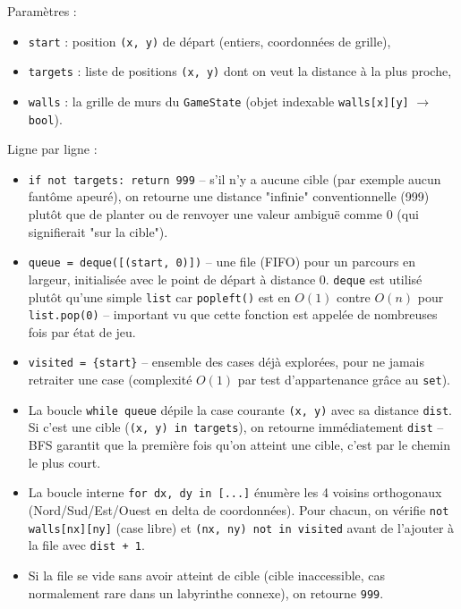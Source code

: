\documentclass[a4paper,12pt]{article}
\begin{document}
Paramètres :
\begin{itemize}
    \item \texttt{start} : position \texttt{(x, y)} de départ (entiers,
    coordonnées de grille),
    \item \texttt{targets} : liste de positions \texttt{(x, y)} dont on
    veut la distance à la plus proche,
    \item \texttt{walls} : la grille de murs du \texttt{GameState}
    (objet indexable \texttt{walls[x][y]} $\to$ \texttt{bool}).
\end{itemize}

Ligne par ligne :
\begin{itemize}
    \item \texttt{if not targets: return 999} -- s'il n'y a aucune cible
    (par exemple aucun fantôme apeuré), on retourne une distance
    "infinie" conventionnelle (999) plutôt que de planter ou de renvoyer
    une valeur ambiguë comme 0 (qui signifierait "sur la cible").
    \item \texttt{queue = deque([(start, 0)])} -- une file (FIFO) pour un
    parcours en largeur, initialisée avec le point de départ à distance 0.
    \texttt{deque} est utilisé plutôt qu'une simple \texttt{list} car
    \texttt{popleft()} est en $O(1)$ contre $O(n)$ pour
    \texttt{list.pop(0)} -- important vu que cette fonction est appelée
    de nombreuses fois par état de jeu.
    \item \texttt{visited = \{start\}} -- ensemble des cases déjà
    explorées, pour ne jamais retraiter une case (complexité $O(1)$ par
    test d'appartenance grâce au \texttt{set}).
    \item La boucle \texttt{while queue} dépile la case courante
    \texttt{(x, y)} avec sa distance \texttt{dist}. Si c'est une cible
    (\texttt{(x, y) in targets}), on retourne immédiatement \texttt{dist}
    -- BFS garantit que la première fois qu'on atteint une cible, c'est
    par le chemin le plus court.
    \item La boucle interne \texttt{for dx, dy in [...]} énumère les 4
    voisins orthogonaux (Nord/Sud/Est/Ouest en delta de coordonnées). Pour
    chacun, on vérifie \texttt{not walls[nx][ny]} (case libre) et
    \texttt{(nx, ny) not in visited} avant de l'ajouter à la file avec
    \texttt{dist + 1}.
    \item Si la file se vide sans avoir atteint de cible (cible
    inaccessible, cas normalement rare dans un labyrinthe connexe), on
    retourne \texttt{999}.
\end{itemize}
\end{document}
